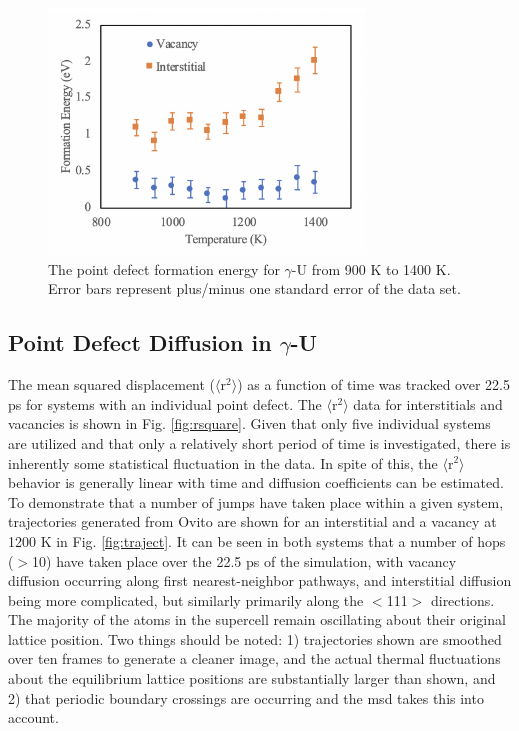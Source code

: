 \documentclass[review]{elsarticle}
\begin{document}
 \begin{figure}[h]
 \centering
 \includegraphics[width=0.75\textwidth]{5_eform.png} 
 \caption{The point defect formation energy for $\gamma$-U from 900 K to 1400 K. Error bars represent plus/minus one standard error of the data set. }
 \label{fig:eform}
\end{figure}



\FloatBarrier

\subsection{Point Defect Diffusion in $\gamma$-U}

The mean squared displacement ($\langle$r$^2$$\rangle$) as a function of time was tracked over 22.5 ps for systems with an individual point defect. The $\langle$r$^2$$\rangle$ data for interstitials and vacancies is shown in Fig. \ref{fig:rsquare}. Given that only five individual systems are utilized and that only a relatively short period of time is investigated, there is inherently some statistical fluctuation in the data. In spite of this, the $\langle$r$^2$$\rangle$ behavior is generally linear with time and diffusion coefficients can be estimated. To demonstrate that a number of jumps have taken place within a given system, trajectories generated from Ovito \cite{ovito} are shown for an interstitial and a vacancy at 1200 K in Fig. \ref{fig:traject}. It can be seen in both systems that a number of hops ($>$10) have taken place over the 22.5 ps of the simulation, with vacancy diffusion occurring along first nearest-neighbor pathways, and interstitial diffusion being more complicated, but similarly primarily along the $<$111$>$ directions. The majority of the atoms in the supercell remain oscillating about their original lattice position. Two things should be noted: 1) trajectories shown are smoothed over ten frames to generate a cleaner image, and the actual thermal fluctuations about the equilibrium lattice positions are substantially larger than shown, and 2) that periodic boundary crossings are occurring and the msd takes this into account. 
\end{document}
